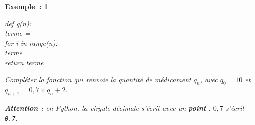 \documentclass[12pt]{article}
\theoremstyle{break}
\newtheorem*{example}{Exemple~:}
\theoremstyle{inline}
\begin{document}
\begin{example}
  \begin{minipage}[c]{0.42\linewidth}
    \begin{python}
      def q(n):\\
      \tab terme = \\
      \tab for i in range(n):\\
      \tab\tab terme = \\
      \tab return terme
    \end{python}
  \end{minipage}
  \hfill
  \begin{minipage}[c]{0.55\linewidth}
    \raggedright
    Compléter la fonction qui renvoie la quantité de médicament $q_n$, avec $q_0 = 10$ et $q_{n+1} = 0{,}7 \times q_n + 2$.

    \smallskip
    \textbf{Attention :} en Python, la virgule décimale s'écrit avec un \textbf{point} : $0{,}7$ s'écrit \texttt{0.7}.
  \end{minipage}
\end{example}
\end{document}
